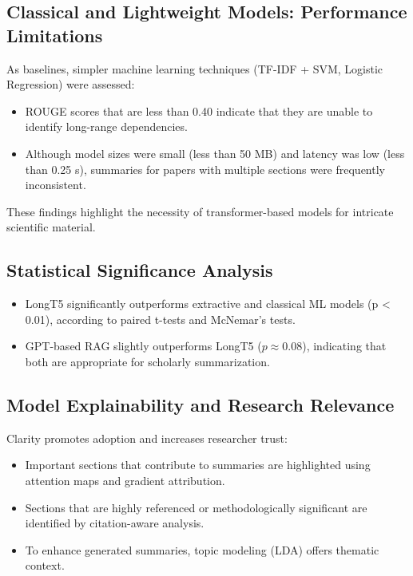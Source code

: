 \documentclass[conference]{IEEEtran}
\begin{document}
\subsection{Classical and Lightweight Models: Performance Limitations}

As baselines, simpler machine learning techniques (TF-IDF + SVM, Logistic Regression) were assessed:

\begin{itemize}
\item ROUGE scores that are less than 0.40 indicate that they are unable to identify long-range dependencies.
\item Although model sizes were small (less than 50 MB) and latency was low (less than 0.25 s), summaries for papers with multiple sections were frequently inconsistent.
\end{itemize}

These findings highlight the necessity of transformer-based models for intricate scientific material.

\subsection{Statistical Significance Analysis}

\begin{itemize}
\item LongT5 significantly outperforms extractive and classical ML models (p < 0.01), according to paired t-tests and McNemar's tests.
\item GPT-based RAG slightly outperforms LongT5 ($p \approx 0.08$), indicating that both are appropriate for scholarly summarization.

\end{itemize}

\subsection{Model Explainability and Research Relevance}

Clarity promotes adoption and increases researcher trust:

\begin{itemize}
\item Important sections that contribute to summaries are highlighted using attention maps and gradient attribution.
\item Sections that are highly referenced or methodologically significant are identified by citation-aware analysis.
\item To enhance generated summaries, topic modeling (LDA) offers thematic context.
\end{itemize}
\end{document}
